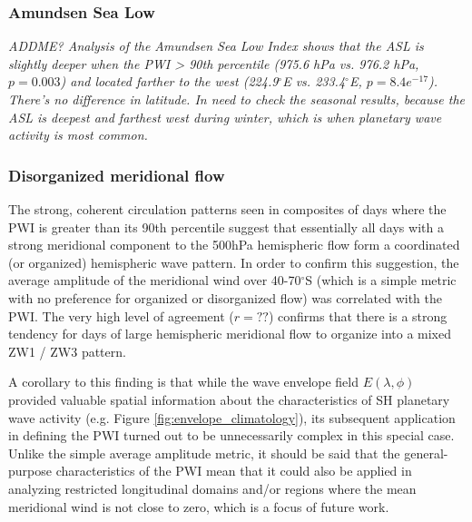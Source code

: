 \subsubsection{Amundsen Sea Low}

\textit{ADDME? Analysis of the Amundsen Sea Low Index \citep{Turner2013} shows that the ASL is slightly deeper when the PWI > 90th percentile (975.6 hPa vs. 976.2 hPa, $p = 0.003$) and located farther to the west (224.9$^{\circ}$E vs. 233.4$^{\circ}$E, $p = 8.4e^{-17}$). There's no difference in latitude.  In need to check the seasonal results, because the ASL is deepest and farthest west during winter, which is when planetary wave activity is most common.}  

\subsubsection{Disorganized meridional flow}

The strong, coherent circulation patterns seen in composites of days where the PWI is greater than its 90th percentile suggest that essentially all days with a strong meridional component to the 500hPa hemispheric flow form a coordinated (or organized) hemispheric wave pattern. In order to confirm this suggestion, the average amplitude of the meridional wind over 40-70$^{\circ}$S (which is a simple metric with no preference for organized or disorganized flow) was correlated with the PWI. The very high level of agreement ($r = ??$) confirms that there is a strong tendency for days of large hemispheric meridional flow to organize into a mixed ZW1 / ZW3 pattern. 

A corollary to this finding is that while the wave envelope field $E(\lambda,\phi)$ provided valuable spatial information about the characteristics of SH planetary wave activity (e.g. Figure \ref{fig:envelope_climatology}), its subsequent application in defining the PWI turned out to be unnecessarily complex in this special case. Unlike the simple average amplitude metric, it should be said that the general-purpose characteristics of the PWI mean that it could also be applied in analyzing restricted longitudinal domains and/or regions where the mean meridional wind is not close to zero, which is a focus of future work.
